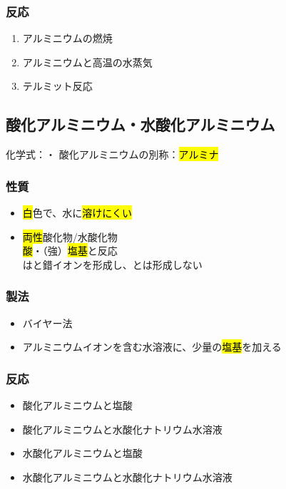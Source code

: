 \subsubsection{反応}
\begin{enumerate}
    \item アルミニウムの燃焼\\
    \item アルミニウムと高温の水蒸気\\
    \item テルミット反応\\
\end{enumerate}
\newpage
\subsection{酸化アルミニウム・水酸化アルミニウム}
化学式：\hl{}・\hl{}
酸化アルミニウムの別称：\hl{アルミナ}
\subsubsection{性質}
\begin{itemize}
    \item \hl{白}色で、水に\hl{溶けにくい}\\
    \item \hl{両性}酸化物/水酸化物\\
          \hl{酸}・（強）\hl{塩基}と反応\\
          は\hl{}と錯イオンを形成し、\hl{}とは形成しない
\end{itemize}
\subsubsection{製法}
\begin{itemize}
    \item バイヤー法
    \item アルミニウムイオンを含む水溶液に、少量の\hl{塩基}を加える \\
\end{itemize}
\subsubsection{反応}
\begin{itemize}
    \item 酸化アルミニウムと塩酸\\
    \item 酸化アルミニウムと水酸化ナトリウム水溶液\\
    \item 水酸化アルミニウムと塩酸\\
    \item 水酸化アルミニウムと水酸化ナトリウム水溶液\\
\end{itemize}
